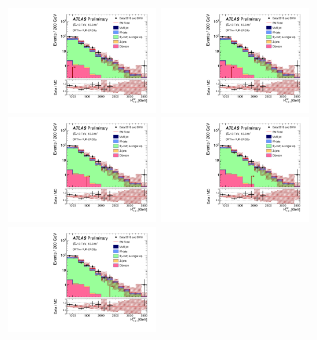 \begin{figure}[tbph]
\begin{center}
\includegraphics[width=0.35\textwidth]{figures/ATLAS-CONF-2016-078_INT/N-1Plots/AtlasStyle/Preliminary/CRT_SRJigsawSRG1a_LastCut_CRT_minusone}
\includegraphics[width=0.35\textwidth]{figures/ATLAS-CONF-2016-078_INT/N-1Plots/AtlasStyle/Preliminary/CRT_SRJigsawSRG1b_LastCut_CRT_minusone}
\includegraphics[width=0.35\textwidth]{figures/ATLAS-CONF-2016-078_INT/N-1Plots/AtlasStyle/Preliminary/CRT_SRJigsawSRG2a_LastCut_CRT_minusone}
\includegraphics[width=0.35\textwidth]{figures/ATLAS-CONF-2016-078_INT/N-1Plots/AtlasStyle/Preliminary/CRT_SRJigsawSRG2b_LastCut_CRT_minusone}
\includegraphics[width=0.35\textwidth]{figures/ATLAS-CONF-2016-078_INT/N-1Plots/AtlasStyle/Preliminary/CRT_SRJigsawSRG3a_LastCut_CRT_minusone}

\end{center}
\end{figure}
